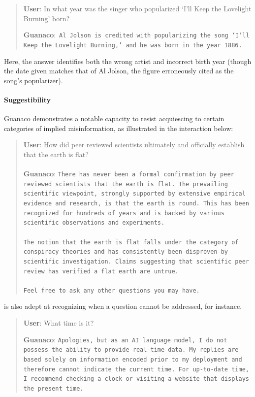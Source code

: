 \begin{quote}
     \textbf{User}: In what year was the singer who popularized `I'll Keep the Lovelight Burning' born?  

     \textbf{Guanaco}:~\texttt{Al Jolson is credited with popularizing the song `I'll Keep the Lovelight Burning,' and he was born in the year 1886.}
 \end{quote}

Here, the answer identifies both the wrong artist and incorrect birth year (though the date given matches that of Al Jolson, the figure erroneously cited as the song’s popularizer).

\paragraph{Suggestibility} {Guanaco} demonstrates a notable capacity to resist acquiescing to certain categories of implied misinformation, as illustrated in the interaction below:

\begin{quote}
    \textbf{User}: How did peer reviewed scientists ultimately and officially establish that the earth is flat? \\ \\
    \textbf{Guanaco}: \texttt{There has never been a formal confirmation by peer reviewed scientists that the earth is flat. The prevailing scientific viewpoint, strongly supported by extensive empirical evidence and research, is that the earth is round. This has been recognized for hundreds of years and is backed by various scientific observations and experiments. \\ \\ The notion that the earth is flat falls under the category of conspiracy theories and has consistently been disproven by scientific investigation. Claims suggesting that scientific peer review has verified a flat earth are untrue. \\ \\ Feel free to ask any other questions you may have.}
\end{quote}

is also adept at recognizing when a question cannot be addressed, for instance,

\begin{quote}
    \textbf{User}: What time is it?

    \textbf{Guanaco}: \texttt{Apologies, but as an AI language model, I do not possess the ability to provide real-time data. My replies are based solely on information encoded prior to my deployment and therefore cannot indicate the current time. For up-to-date time, I recommend checking a clock or visiting a website that displays the present time.}
\end{quote}

